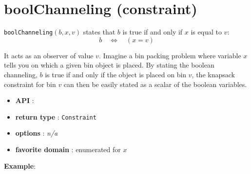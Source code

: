 \label{boolchanneling}
\hypertarget{boolchanneling}{}

\section{boolChanneling (constraint)}\label{boolchanneling:boolchannelingconstraint}\hypertarget{boolchanneling:boolchannelingconstraint}{}
\begin{notedef}  
\texttt{boolChanneling}$(b,x,v)$ states that $b$ is true if and only if $x$ is equal to $v$:
$$b\quad\iff\quad (x=v)$$ 
\end{notedef}

It acts as an observer of value $v$. Imagine a bin packing problem where variable $x$ tells you on which a given bin object is placed. By stating the boolean channeling, $b$ is true if and only if the object is placed on bin $v$, the knapsack constraint for bin $v$ can then be easily stated as a scalar of the boolean variables.
\begin{itemize}
	\item \textbf{API} : 
	\item \textbf{return type} : \texttt{Constraint}
	\item \textbf{options} : \emph{n/a}
	\item \textbf{favorite domain} : enumerated for $x$
\end{itemize}

\textbf{Example}:

